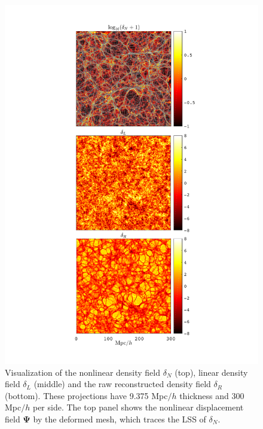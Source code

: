 \documentclass[aps,prd,twocolumn,superscriptaddress,amsfont,amssymb,amsmath,nofootinbib,showpacs,balancelastpage]{revtex4-1}
\newcommand{\bs}{\boldsymbol}
\begin{document}
\maketitle
\begin{figure}
 \centering
  \includegraphics[width=0.95\linewidth]{denx3.pdf}
  \caption{Visualization of the nonlinear density field $\delta_N$ (top),
  linear density field $\delta_L$ (middle) and the raw reconstructed density
  field $\delta_R$ (bottom). These projections have 9.375 Mpc$/h$ thickness
  and 300 Mpc$/h$ per side. The top panel shows the nonlinear displacement
  field $\bs\Psi$ by the deformed mesh, which traces the LSS of $\delta_N$.}
  \label{fig.projection}
\end{figure}
\end{document}
